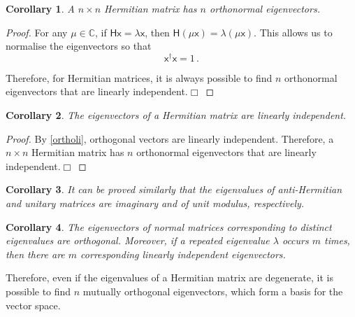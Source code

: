 \documentclass{article}
\theoremstyle{plain}\theoremheaderfont{\normalfont\itshape}\theorembodyfont{\rmfamily}\theoremseparator{.}\newtheorem*{rem}{Remark}\newtheorem*{ex}{Example}\newtheorem*{proof}{Proof}\newtheorem*{altp}{Alternative proof}
\theoremstyle{plain}\theoremheaderfont{\normalfont\bfseries}\theorembodyfont{\rmfamily}\theoremseparator{.}\newtheorem{thm}{Theorem}[section]\newtheorem{lem}[thm]{Lemma}\newtheorem{prop}[thm]{Proposition}\newtheorem*{cor}{Corollary}\newtheorem{defn}[thm]{Definition}\newtheorem{clm}[thm]{Claim}\newtheorem{clminproof}{Claim}
\theoremstyle{break}\theoremheaderfont{\normalfont\itshape}\theorembodyfont{\rmfamily}\theoremseparator{.\medskip}\newtheorem*{proofskip}{Proof}\newtheorem*{exs}{Examples}\newtheorem*{rems}{Remarks}
\theoremstyle{break}\theoremheaderfont{\normalfont\bfseries}\theorembodyfont{\rmfamily}\theoremseparator{.\medskip}\newtheorem{lemskip}[thm]{Lemma}\newtheorem{defnskip}[thm]{Definition}\newtheorem{propskip}[thm]{Proposition}\newtheorem{thmskip}[thm]{Theorem}
\numberwithin{equation}{section}
\newcommand{\qed}{\hfill\ensuremath{\Box}}
\begin{document}
	\begin{cor}
		A \(n\times n\) Hermitian matrix has \(n\) orthonormal eigenvectors.
	\end{cor}
	\begin{proof}
		For any \(\mu\in\mathbb{C}\), if \(\mathsf{Hx}=\lambda\mathsf{x}\), then \(\mathsf{H}(\mu\mathsf{x})=\lambda(\mu\mathsf{x})\). This allows us to normalise the eigenvectors so that
		\[\mathsf{x^\dagger x}=1\,.\]
		
		Therefore, for Hermitian matrices, it is always possible to find \(n\) orthonormal eigenvectors that are linearly independent.\qed
	\end{proof}
	\begin{cor}
		The eigenvectors of a Hermitian matrix are linearly independent.
	\end{cor}
	\begin{proof}
		By \cref{ortholi}, orthogonal vectors are linearly independent. Therefore, a \(n\times n\) Hermitian matrix has \(n\) orthonormal eigenvectors that are linearly independent.\qed
	\end{proof}
	\begin{cor}
		It can be proved similarly that the eigenvalues of anti-Hermitian and unitary matrices are imaginary and of unit modulus, respectively.
	\end{cor}
	\begin{cor}
		The eigenvectors of normal matrices corresponding to distinct eigenvalues are orthogonal. Moreover, if a repeated eigenvalue \(\lambda\) occurs \(m\) times, then there are \(m\) corresponding linearly independent eigenvectors.
	\end{cor}
	
	Therefore, even if the eigenvalues of a Hermitian matrix are degenerate, it is possible to find \(n\) mutually orthogonal eigenvectors, which form a basis for the vector space.
	
\end{document}
